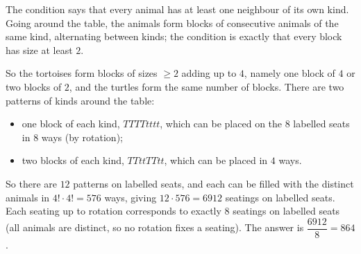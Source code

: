 The condition says that every animal has at least one neighbour of its own kind. Going around the table, the animals form blocks of consecutive animals of the same kind, alternating between kinds; the condition is exactly that every block has size at least $2$.

So the tortoises form blocks of sizes $\ge2$ adding up to $4$, namely one block of $4$ or two blocks of $2$, and the turtles form the same number of blocks. There are two patterns of kinds around the table:
\begin{itemize}
\item one block of each kind, $TTTTtttt$, which can be placed on the $8$ labelled seats in $8$ ways (by rotation);
\item two blocks of each kind, $TTttTTtt$, which can be placed in $4$ ways.
\end{itemize}
So there are $12$ patterns on labelled seats, and each can be filled with the distinct animals in $4!\cdot4!=576$ ways, giving $12\cdot576=6912$ seatings on labelled seats. Each seating up to rotation corresponds to exactly $8$ seatings on labelled seats (all animals are distinct, so no rotation fixes a seating). The answer is $\dfrac{6912}{8}=\boxed{864}$.
